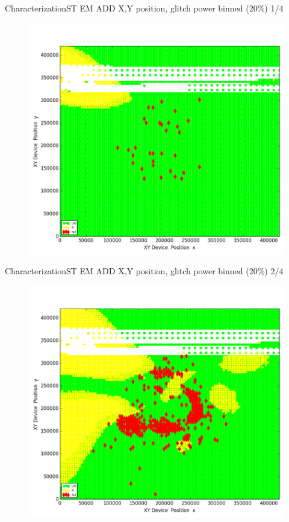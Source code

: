 \documentclass[table]{beamer}
\begin{document}
\begin{frame}{Characterization}{ST EM ADD X,Y position, glitch power binned (20\%) 1/4}
    \vspace{-.3cm}
    \begin{figure}[H]
      \centering
      \includegraphics[width=.75\textwidth]{../../plots/newplots/st-add-x-y-power-1.png}
    \end{figure}
\end{frame}
\begin{frame}{Characterization}{ST EM ADD X,Y position, glitch power binned (20\%) 2/4}
    \vspace{-.3cm}
    \begin{figure}[H]
      \centering
      \includegraphics[width=.75\textwidth]{../../plots/newplots/st-add-x-y-power-2.png}
    \end{figure}
\end{frame}
\end{document}
